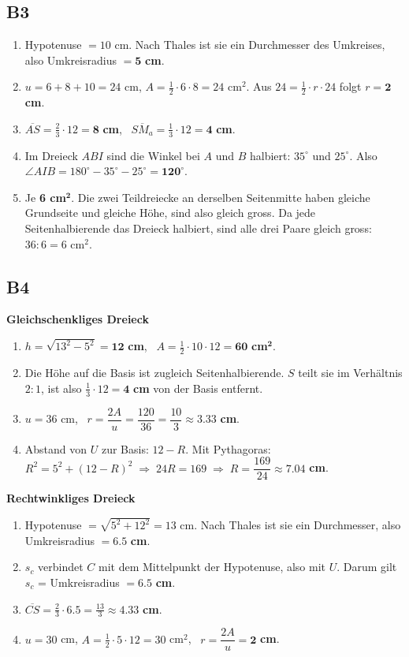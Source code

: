 \documentclass[11pt,a4paper]{article}
\begin{document}
\subsection{B3}
\begin{enumerate}
\item Hypotenuse $= 10$ cm. Nach Thales ist sie ein Durchmesser des Umkreises, also Umkreisradius $= \mathbf{5}$ \textbf{cm}.
\item $u = 6+8+10 = 24$ cm, $A = \tfrac12 \cdot 6 \cdot 8 = 24$ cm$^2$. Aus $24 = \tfrac12 \cdot r \cdot 24$ folgt $r = \mathbf{2}$ \textbf{cm}.
\item $\overline{AS} = \tfrac23 \cdot 12 = \mathbf{8}$ \textbf{cm}, \ $\overline{SM_a} = \tfrac13 \cdot 12 = \mathbf{4}$ \textbf{cm}.
\item Im Dreieck $ABI$ sind die Winkel bei $A$ und $B$ halbiert: $35^\circ$ und $25^\circ$. Also $\angle AIB = 180^\circ - 35^\circ - 25^\circ = \mathbf{120^\circ}$.
\item Je \textbf{6 cm}$^\mathbf{2}$. Die zwei Teildreiecke an derselben Seitenmitte haben gleiche Grundseite und gleiche H\"ohe, sind also gleich gross. Da jede Seitenhalbierende das Dreieck halbiert, sind alle drei Paare gleich gross: $36 : 6 = 6$ cm$^2$.
\end{enumerate}

\subsection{B4}
\textbf{Gleichschenkliges Dreieck}
\begin{enumerate}
\item $h = \sqrt{13^2 - 5^2} = \mathbf{12}$ \textbf{cm}, \ $A = \tfrac12 \cdot 10 \cdot 12 = \mathbf{60}$ \textbf{cm}$^\mathbf{2}$.
\item Die H\"ohe auf die Basis ist zugleich Seitenhalbierende. $S$ teilt sie im Verh\"altnis $2:1$, ist also $\tfrac13 \cdot 12 = \mathbf{4}$ \textbf{cm} von der Basis entfernt.
\item $u = 36$ cm, \ $r = \dfrac{2A}{u} = \dfrac{120}{36} = \dfrac{10}{3} \approx \mathbf{3.33}$ \textbf{cm}.
\item Abstand von $U$ zur Basis: $12 - R$. Mit Pythagoras: $R^2 = 5^2 + (12-R)^2 \;\Rightarrow\; 24R = 169 \;\Rightarrow\; R = \dfrac{169}{24} \approx \mathbf{7.04}$ \textbf{cm}.
\end{enumerate}
\textbf{Rechtwinkliges Dreieck}
\begin{enumerate}
\item Hypotenuse $= \sqrt{5^2+12^2} = 13$ cm. Nach Thales ist sie ein Durchmesser, also Umkreisradius $= \mathbf{6.5}$ \textbf{cm}.
\item $s_c$ verbindet $C$ mit dem Mittelpunkt der Hypotenuse, also mit $U$. Darum gilt $s_c$ = Umkreisradius $= \mathbf{6.5}$ \textbf{cm}.
\item $\overline{CS} = \tfrac23 \cdot 6.5 = \tfrac{13}{3} \approx \mathbf{4.33}$ \textbf{cm}.
\item $u = 30$ cm, $A = \tfrac12 \cdot 5 \cdot 12 = 30$ cm$^2$, \ $r = \dfrac{2A}{u} = \mathbf{2}$ \textbf{cm}.
\end{enumerate}
\end{document}
